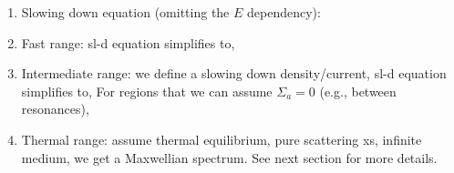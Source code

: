 \documentclass{school-22.211-notes}
\begin{document}
\clearpage
{} 
\begin{enumerate}
\item Slowing down equation (omitting the $E$ dependency): 
  
\item Fast range: sl-d equation simplifies to, 
  
\item Intermediate range: we define a slowing down density/current, 
  sl-d equation simplifies to, 
  For regions that we can assume $\Sigma_a = 0$ (e.g., between resonances), 

\item Thermal range: assume thermal equilibrium, pure scattering xs, infinite medium, we get a Maxwellian spectrum. See next section for more details.
\end{enumerate}
\end{document}
